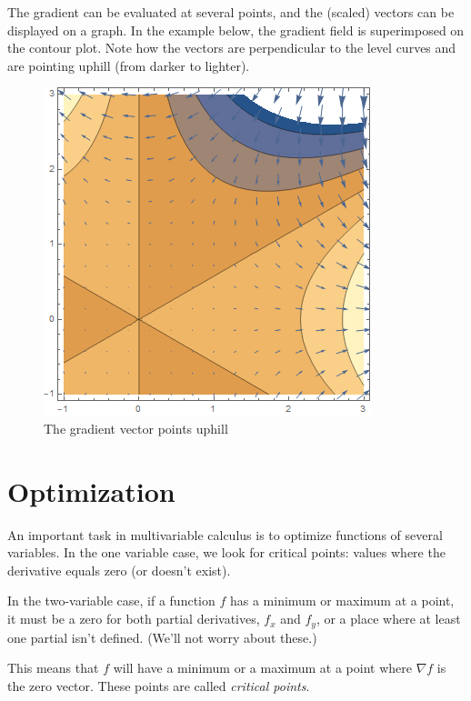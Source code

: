 \documentclass[
]{book}
\theoremstyle{definition}
\theoremstyle{definition}
\theoremstyle{definition}
\theoremstyle{definition}
\theoremstyle{remark}
\begin{document}
The gradient can be evaluated at several points, and the (scaled) vectors can be displayed on a graph. In the example below, the gradient field is superimposed on the contour plot. Note how the vectors are perpendicular to the level curves and are pointing uphill (from darker to lighter).

\begin{figure}

{\centering \includegraphics[width=0.75\linewidth]{images/gfp} 

}

\caption{The gradient vector points uphill}\label{fig:gfp}
\end{figure}

\section{Optimization}\label{optimization}

An important task in multivariable calculus is to optimize functions of several variables. In the one variable case, we look for critical points: values where the derivative equals zero (or doesn't exist).

In the two-variable case, if a function \(f\) has a minimum or maximum at a point, it must be a zero for both partial derivatives, \(f_x\) and \(f_y\), or a place where at least one partial isn't defined. (We'll not worry about these.)

This means that \(f\) will have a minimum or a maximum at a point where \(\nabla f\) is the zero vector. These points are called \emph{critical points}.
\end{document}
